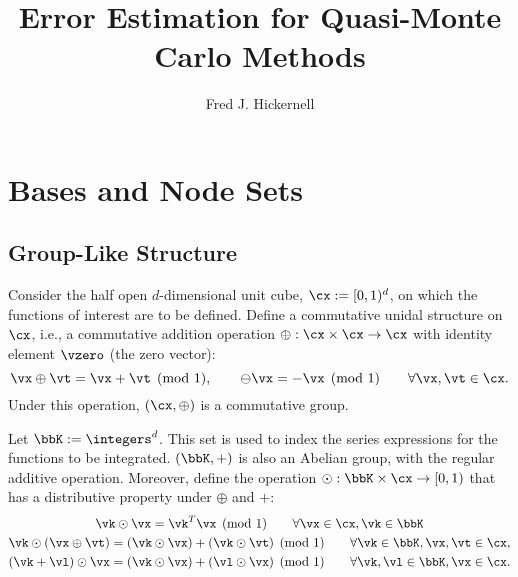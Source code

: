 \documentclass[]{elsarticle}
\theoremstyle{definition}
\theoremstyle{remark}
\begin{document}
\begin{frontmatter}

\title{Error Estimation for Quasi-Monte Carlo Methods}
\author{Fred J. Hickernell}
\address{Room E1-208, Department of Applied Mathematics, Illinois Institute of Technology,\\ 10 W.\ 32$^{\text{nd}}$ St., Chicago, IL 60616}
\begin{abstract}
\end{abstract}

\begin{keyword}


\end{keyword}
\end{frontmatter}

\section{Bases and Node Sets}

\subsection{Group-Like Structure}
Consider the half open $d$-dimensional unit cube, $\cx:=[0,1)^d$, on which the functions of interest are to be defined. Define a commutative unidal structure on $\cx$, i.e., a commutative addition operation $\oplus:\cx \times \cx \to \cx$ with identity element $\vzero$ (the zero vector):
\[
\vx \oplus \vt = \vx + \vt \pmod 1, \qquad \ominus \vx = -\vx \pmod 1 \qquad \forall \vx, \vt \in \cx.
\]
Under this operation, $(\cx,\oplus)$ is a commutative group.

Let $\bbK:=\integers^d$. This set is used to index the series expressions for the functions to be integrated.  $(\bbK,+)$ is also an Abelian group, with the regular additive operation.  Moreover, define the operation $\odot: \bbK \times \cx \to [0,1)$ that has a distributive property under $\oplus$ and $+$:
\begin{subequations} \label{distrib}
\begin{gather}
\vk \odot \vx = \vk^T \vx \pmod 1 \qquad \forall \vx \in \cx, \vk \in \bbK \\
\vk \odot (\vx \oplus \vt) = (\vk\odot\vx) + (\vk\odot\vt) \pmod 1 \qquad \forall \vk \in \bbK, \vx, \vt \in \cx, \\
(\vk + \vl) \odot \vx = (\vk\odot\vx) + (\vl\odot\vx) \pmod 1 \qquad \forall \vk,\vl \in \bbK, \vx \in \cx.
\end{gather}
\end{subequations}
\end{document}
